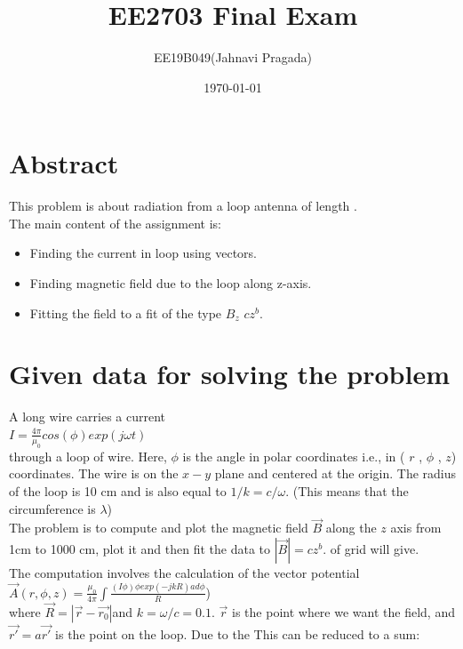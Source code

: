 \documentclass[11pt, a4paper]{article}
\title{EE2703 Final Exam} %
\author{EE19B049(Jahnavi Pragada)} %
\date{\today} %
\begin{document}
	
		
\maketitle %
\section*{Abstract}
This problem is about radiation from a loop antenna of length \lambda.\\

The main content of the assignment is: 
\begin{itemize}
\item Finding the current in loop using vectors.
\item Finding magnetic field due to the loop along z-axis.
\item Fitting the field to a fit of the type $B_z$ \approx  $cz^b$. 
\end{itemize}

\section*{Given data for solving the problem}
A long wire carries a current\\

$I =\frac{4\pi}{\mu_0}cos(\phi)exp(jωt)$ 
\\ 

through a loop of wire. Here, $\phi$ is the angle in polar coordinates i.e., in ( $r$ , $\phi$ , $z$) coordinates.
The wire is on the $x-y$ plane and centered at the origin. The radius of the loop is 10 cm
and is also equal to $1/k = c/\omega$. (This means that the circumference is $\lambda$)\\

The problem is to compute and plot the magnetic field $\vec{B}$ along the $z$ axis from 1cm to 1000 cm, plot it and then fit the data to $|\vec{B}| = cz^b$.
of grid will give.\\

The computation involves the calculation of the vector potential\\

$\vec{A}(r, \phi, z) = \frac{\mu_0}{4\pi}\int \frac{(I\phi) \phi exp(−jkR) a d\phi}{R} $)\\

where $\vec{R} =|\vec{r}-\vec{r_0}|$and $k = \omega /c = 0.1$. $\vec{r}$  is the point where we want the field, and $\vec{r'} = a\vec{r'}$ is the point on the loop. Due to the This can be reduced to a sum:\\
\end{document}

